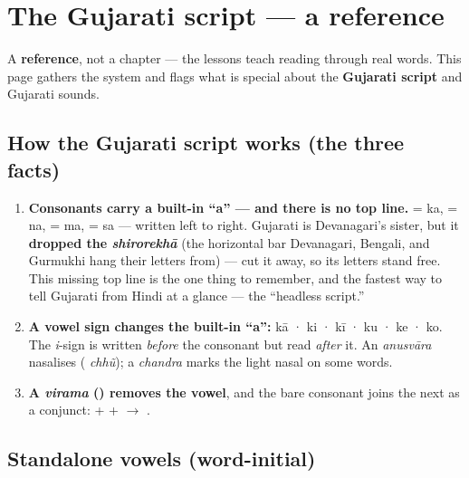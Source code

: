 
\chapter*{The Gujarati script --- a reference}

A \textbf{reference}, not a chapter — the lessons teach reading through real words. This page gathers the system and flags what is special about the \textbf{Gujarati script} and Gujarati sounds.

\section*{How the Gujarati script works (the three facts)}

\begin{enumerate}
\raggedright
\setlength{\itemsep}{0.35em}
  \item \textbf{Consonants carry a built-in \textquotedblleft{}a\textquotedblright{} — and there is no top line.}  = ka,  = na,  = ma,  = sa — written left to right. Gujarati is Devanagari's sister, but it \textbf{dropped the \emph{shirorekhā}} (the horizontal bar Devanagari, Bengali, and Gurmukhi hang their letters from) — cut it away, so its letters stand free. This missing top line is the one thing to remember, and the fastest way to tell Gujarati from Hindi at a glance — the \textquotedblleft{}headless script.\textquotedblright{}
  \item \textbf{A vowel sign changes the built-in \textquotedblleft{}a\textquotedblright{}:}  kā ·  ki ·  kī ·  ku ·  ke ·  ko. The \emph{i}-sign \textbf{} is written \emph{before} the consonant but read \emph{after} it. An \emph{anusvāra}  nasalises ( \emph{chhũ}); a \emph{chandra}  marks the light nasal on some words.
  \item \textbf{A \emph{virama} () removes the vowel}, and the bare consonant joins the next as a conjunct:  +  +  $\to$ .
\end{enumerate}

\section*{Standalone vowels (word-initial)}


